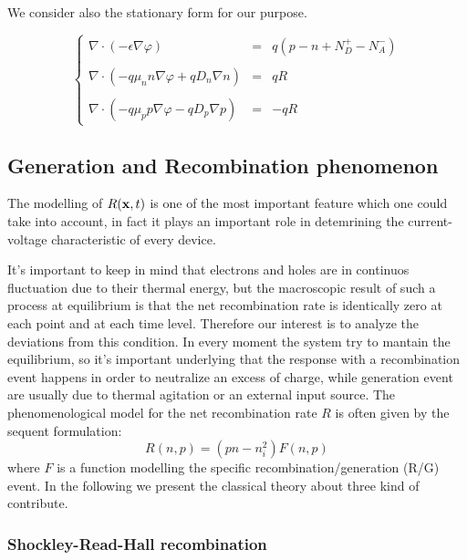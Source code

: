 We consider also the stationary form for our purpose.

\begin{equation}
\label{eq: stationary problem}
\left\{
\begin{array}{rcl}
\nabla \cdot (-\epsilon \nabla \varphi) & = & q(p-n+N_D^+-N_A^-) \\ \\
\nabla \cdot ( - q\mu_n n \nabla \varphi + qD_n \nabla n )& = & qR \\ \\
\nabla \cdot (- q\mu_p p \nabla \varphi - qD_p \nabla p )& = & -qR
\end{array}
\right.
\end{equation}

\subsection{Generation and Recombination phenomenon}

The modelling of $R(\mathbf{x},t)$ is one of the most important feature which one could take into account, in fact it plays an important role in detemrining the current-voltage characteristic of every device.
 
It's important to keep in mind that electrons and holes are in continuos fluctuation due to their thermal energy, but the macroscopic result of such a process at equilibrium is that the net recombination rate is identically zero at each point and at each time level. Therefore our interest is to analyze the deviations from this condition. In every moment the system try to mantain the equilibrium, so it's important underlying that the response with a recombination event happens in order to neutralize an excess of charge, while generation event are usually due to thermal agitation or an external input source.
The phenomenological model for the net recombination rate $R$ is often given by the sequent formulation:
\begin{equation}
\label{eq: generic RG}
R(n,p) = (pn-n_i^2)F(n,p)
\end{equation}
where $F$ is a function modelling the specific recombination/generation (R/G) event.
In the following we present the classical theory about three kind of contribute. 

\subsubsection{Shockley-Read-Hall recombination}

